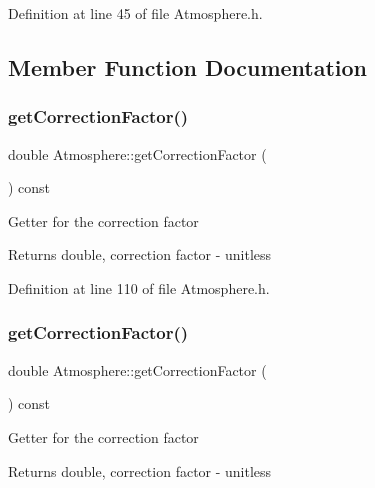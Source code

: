 Definition at line 45 of file Atmosphere.\+h.



\subsection{Member Function Documentation}
\mbox{\label{class_atmosphere_a79c94343c7b6659b2f79688a1ba69aed}} 
\subsubsection{\texorpdfstring{get\+Correction\+Factor()}{getCorrectionFactor()}\hspace{0.1cm}{\footnotesize\ttfamily [1/3]}}
{\footnotesize\ttfamily double Atmosphere\+::get\+Correction\+Factor (\begin{DoxyParamCaption}{ }\end{DoxyParamCaption}) const\hspace{0.3cm}{\ttfamily [inline]}}

Getter for the correction factor \begin{DoxyReturn}{Returns}
double, correction factor -\/ unitless 
\end{DoxyReturn}


Definition at line 110 of file Atmosphere.\+h.

\mbox{\label{class_atmosphere_a79c94343c7b6659b2f79688a1ba69aed}} 
\subsubsection{\texorpdfstring{get\+Correction\+Factor()}{getCorrectionFactor()}\hspace{0.1cm}{\footnotesize\ttfamily [2/3]}}
{\footnotesize\ttfamily double Atmosphere\+::get\+Correction\+Factor (\begin{DoxyParamCaption}{ }\end{DoxyParamCaption}) const\hspace{0.3cm}{\ttfamily [inline]}}

Getter for the correction factor \begin{DoxyReturn}{Returns}
double, correction factor -\/ unitless 
\end{DoxyReturn}


